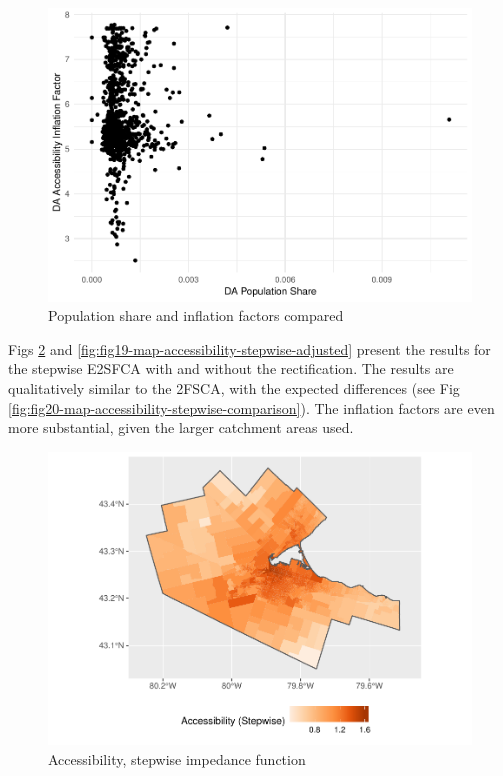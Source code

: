 \documentclass[10pt,letterpaper]{article}
\begin{document}
\begin{figure}
\includegraphics[width=0.95\linewidth]{Supply_and_Demand_Inflation_in_FCA_Methods_v2.1_files/figure-latex/fig17-map-pop-share-inflation-comparison-binary-1} \caption{\label{fig:fig17-map-pop-share-inflation-comparison-binary}Population share and inflation factors compared}\label{fig:fig17-map-pop-share-inflation-comparison-binary}
\end{figure}

Figs \ref{fig:fig18-map-accessibility-stepwise} and
\ref{fig:fig19-map-accessibility-stepwise-adjusted} present the results
for the stepwise E2SFCA with and without the rectification. The results
are qualitatively similar to the 2FSCA, with the expected differences
(see Fig \ref{fig:fig20-map-accessibility-stepwise-comparison}). The
inflation factors are even more substantial, given the larger catchment
areas used.

\begin{figure}
\includegraphics[width=0.95\linewidth]{Supply_and_Demand_Inflation_in_FCA_Methods_v2.1_files/figure-latex/fig18-map-accessibility-stepwise-1} \caption{\label{fig:fig18-map-accessibility-stepwise}Accessibility, stepwise impedance function}\label{fig:fig18-map-accessibility-stepwise}
\end{figure}
\end{document}
